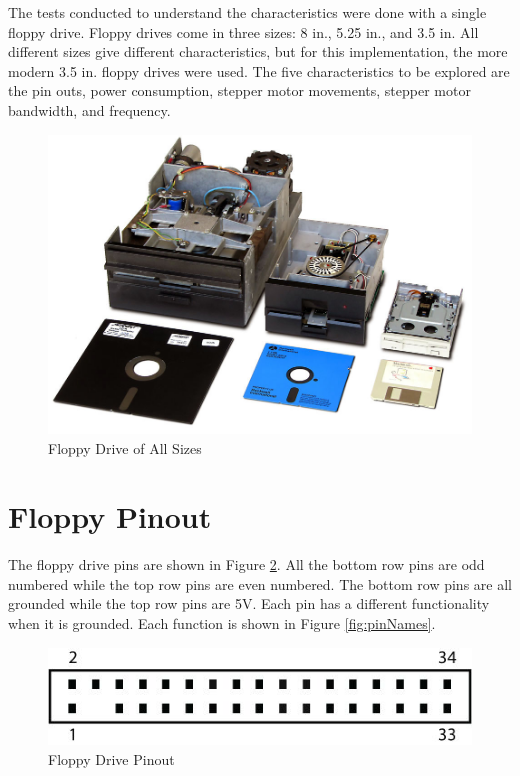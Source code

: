 \documentclass[11pt, a4paper]{report}
\begin{document}
The tests conducted to understand the characteristics were done with a single floppy drive. Floppy drives come in three sizes: 8 in., 5.25 in., and 3.5 in. All different sizes give different characteristics, but for this implementation, the more modern 3.5 in. floppy drives were used. The five characteristics to be explored are the pin outs, power consumption, stepper motor movements, stepper motor bandwidth, and frequency.

\begin{figure}[H]
\hspace*{-2cm}    
    \centering
    \includegraphics[width=.5\textwidth]{floppydrive_sizes.jpg}
    \caption{Floppy Drive of All Sizes}
    \label{fig:sizes}
\end{figure}

\section{Floppy Pinout}

The floppy drive pins are shown in Figure \ref{fig:pinOut}. All the bottom row pins are odd numbered while the top row pins are even numbered. The bottom row pins are all grounded while the top row pins are 5V. Each pin has a different functionality when it is grounded. Each function is shown in Figure \ref{fig:pinNames}. 

\begin{figure}[H]
\hspace*{-2cm}    
    \centering
    \includegraphics[width=.75\textwidth]{floppy_pinout.jpg}
    \caption{Floppy Drive Pinout}
    \label{fig:pinOut}
\end{figure}
\end{document}
